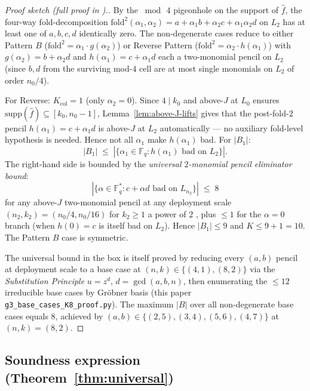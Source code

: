 \documentclass[11pt]{article}
\theoremstyle{definition}
\theoremstyle{remark}
\newcommand{\FF}{\mathbb{F}}
\begin{document}
\begin{proof}[Proof sketch (full proof in \cite{CompanionRepo}).]
By the $\bmod\,4$ pigeonhole on the support of $\hat f$, the four-way
fold-decomposition $\mathrm{fold}^2(\alpha_1, \alpha_2) = a + \alpha_1 b
+ \alpha_2 c + \alpha_1 \alpha_2 d$ on $L_2$ has at least one of
$a, b, c, d$ identically zero. The non-degenerate cases reduce to
either Pattern $B$ ($\mathrm{fold}^2 = \alpha_1 \cdot g(\alpha_2)$) or
Reverse Pattern ($\mathrm{fold}^2 = \alpha_2 \cdot h(\alpha_1)$) with
$g(\alpha_2) = b + \alpha_2 d$ and $h(\alpha_1) = c + \alpha_1 d$ each a
two-monomial pencil on $L_2$ (since $b, d$ from the surviving
mod-$4$ cell are at most single monomials on $L_2$ of order $n_0/4$).

For Reverse: $K_{\mathrm{col}} = 1$ (only $\alpha_2 = 0$). Since
$4 \mid k_0$ and above-$J$ at $L_0$ ensures
$\mathrm{supp}(\hat f) \subseteq [k_0, n_0 - 1]$,
Lemma~\ref{lem:above-J-lifts} gives that the post-fold-$2$
pencil $h(\alpha_1) = c + \alpha_1 d$ is above-$J$ at $L_2$
automatically --- no auxiliary fold-level hypothesis is needed.
Hence not all $\alpha_1$ make $h(\alpha_1)$ bad. For $|B_1|$:
\[
 |B_1| \;\leq\; |\{\alpha_1 \in \FF_q : h(\alpha_1) \text{ bad on } L_2\}|.
\]
The right-hand side is bounded by the \emph{universal $2$-monomial
pencil eliminator bound}:
\[
 \boxed{\quad |\{\alpha \in \FF_q^* : c + \alpha d \text{ bad on } L_{n_2}\}| \;\leq\; 8 \quad}
\]
for any above-$J$ two-monomial pencil at any deployment scale
$(n_2, k_2) = (n_0/4, n_0/16)$ for $k_2 \geq 1$ a power of $2$
, plus $\leq 1$ for the $\alpha = 0$ branch
(when $h(0) = c$ is itself bad on $L_2$). Hence $|B_1| \leq 9$ and
$K \leq 9 + 1 = 10$. The Pattern $B$ case is symmetric.

The universal bound in the box is itself proved by reducing every
$(a, b)$ pencil at deployment scale to a base case at
$(n, k) \in \{(4, 1), (8, 2)\}$ via the \emph{Substitution Principle}
$u = z^d$, $d = \gcd(a, b, n)$, then enumerating
the $\leq 12$ irreducible base cases by Gröbner basis (this paper
\texttt{g3\_base\_cases\_K8\_proof.py}). The maximum $|B|$ over all
non-degenerate base cases equals $8$, achieved by $(a, b) \in
\{(2, 5), (3, 4), (5, 6), (4, 7)\}$ at $(n, k) = (8, 2)$.
\end{proof}

\subsection{Soundness expression (Theorem~\ref{thm:universal})}
\label{prf:thm:universal}
\end{document}
